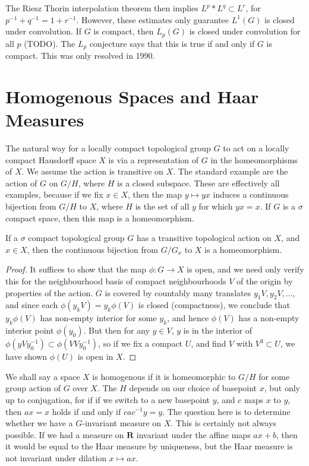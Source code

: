 The Riesz Thorin interpolation theorem then implies $L^p * L^q \subset L^r$, for $p^{-1} + q^{-1} = 1 + r^{-1}$. However, these estimates only guarantee $L^1(G)$ is closed under convolution. If $G$ is compact, then $L_p(G)$ is closed under convolution for all $p$ (TODO). The $L_p$ conjecture says that this is true if and only if $G$ is compact. This was only resolved in 1990.

\section{Homogenous Spaces and Haar Measures}

The natural way for a locally compact topological group $G$ to act on a locally compact Hausdorff space $X$ is via a representation of $G$ in the homeomorphisms of $X$. We assume the action is transitive on $X$. The standard example are the action of $G$ on $G/H$, where $H$ is a closed subspace. These are effectively all examples, because if we fix $x \in X$, then the map $y \mapsto yx$ induces a continuous bijection from $G/H$ to $X$, where $H$ is the set of all $y$ for which $yx = x$. If $G$ is a $\sigma$ compact space, then this map is a homeomorphism.

\begin{theorem}
    If a $\sigma$ compact topological group $G$ has a transitive topological action on $X$, and $x \in X$, then the continuous bijection from $G/G_x$ to $X$ is a homeomorphism.
\end{theorem}
\begin{proof}
    It suffices to show that the map $\phi: G \to X$ is open, and we need only verify this for the neighbourhood basis of compact neighbourhoods $V$ of the origin by properties of the action. $G$ is covered by countably many translates $y_1V, y_2V, \dots$, and since each $\phi(y_kV) = y_k \phi(V)$ is closed (compactness), we conclude that $y_k \phi(V)$ has non-empty interior for some $y_k$, and hence $\phi(V)$ has a non-empty interior point $\phi(y_0)$. But then for any $y \in V$, $y$ is in the interior of $\phi(y V y_0^{-1}) \subset \phi(VV y_0^{-1})$, so if we fix a compact $U$, and find $V$ with $V^3 \subset U$, we have shown $\phi(U)$ is open in $X$.
\end{proof}

We shall say a space $X$ is homogenous if it is homeomorphic to $G/H$ for some group action of $G$ over $X$. The $H$ depends on our choice of basepoint $x$, but only up to conjugation, for if if we switch to a new basepoint $y$, and $c$ maps $x$ to $y$, then $ax = x$ holds if and only if $cac^{-1}y = y$. The question here is to determine whether we have a $G$-invariant measure on $X$. This is certainly not always possible. If we had a measure on $\mathbf{R}$ invariant under the affine maps $ax + b$, then it would be equal to the Haar measure by uniqueness, but the Haar measure is not invariant under dilation $x \mapsto ax$.

